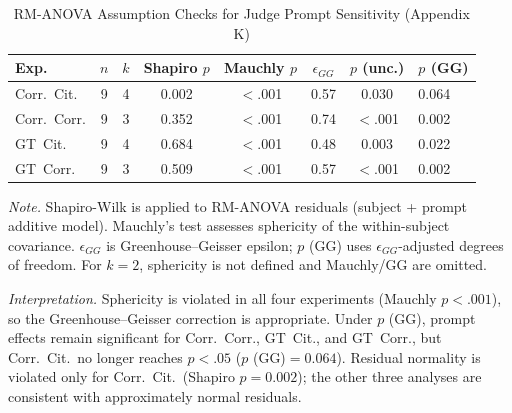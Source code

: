\begin{table}[H]
\centering
\caption{RM-ANOVA Assumption Checks for Judge Prompt Sensitivity (Appendix K)}
\label{tab:prompt_sensitivity_assumptions}
\begin{threeparttable}
\scriptsize
\setlength{\tabcolsep}{3pt}
\renewcommand{\arraystretch}{1.1}
\begin{tabular}{lccccccl}
\toprule
\textbf{Exp.} & \textbf{$n$} & \textbf{$k$} & \textbf{Shapiro $p$} & \textbf{Mauchly $p$} & \textbf{$\epsilon_{GG}$} & \textbf{$p$ (unc.)} & \textbf{$p$ (GG)} \\
\midrule
Corr.\ Cit. & 9 & 4 & 0.002 & $<$.001 & 0.57 & 0.030 & 0.064 \\
Corr.\ Corr. & 9 & 3 & 0.352 & $<$.001 & 0.74 & $<$.001 & 0.002 \\
GT\ Cit. & 9 & 4 & 0.684 & $<$.001 & 0.48 & 0.003 & 0.022 \\
GT\ Corr. & 9 & 3 & 0.509 & $<$.001 & 0.57 & $<$.001 & 0.002 \\
\bottomrule
\end{tabular}
\begin{tablenotes}
\scriptsize
\item \textit{Note.} Shapiro-Wilk is applied to RM-ANOVA residuals (subject + prompt additive model). Mauchly's test assesses sphericity of the within-subject covariance. $\epsilon_{GG}$ is Greenhouse--Geisser epsilon; $p$ (GG) uses $\epsilon_{GG}$-adjusted degrees of freedom. For $k=2$, sphericity is not defined and Mauchly/GG are omitted.
\end{tablenotes}
\end{threeparttable}
\end{table}

\noindent\textit{Interpretation.} Sphericity is violated in all four experiments (Mauchly $p<.001$), so the Greenhouse--Geisser correction is appropriate. Under $p$ (GG), prompt effects remain significant for Corr.\ Corr., GT\ Cit., and GT\ Corr., but Corr.\ Cit.\ no longer reaches $p<.05$ ($p$ (GG)$=0.064$). Residual normality is violated only for Corr.\ Cit.\ (Shapiro $p=0.002$); the other three analyses are consistent with approximately normal residuals.